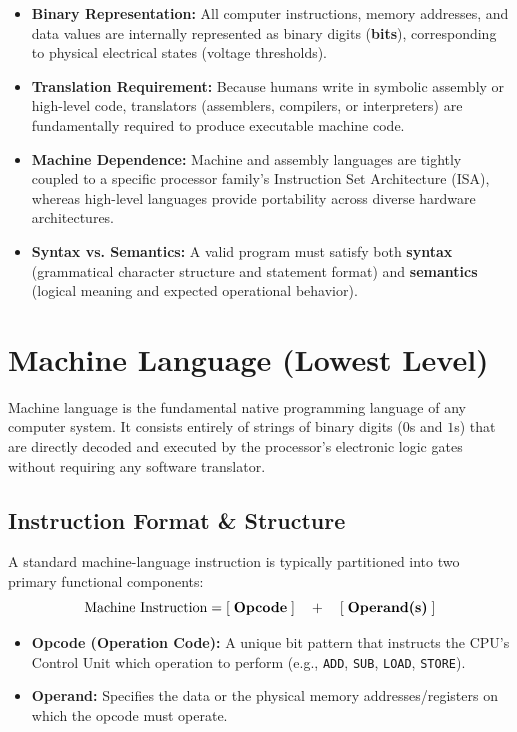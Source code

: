 \begin{definition}
\begin{itemize}[leftmargin=1.2em, itemsep=3pt]
    \item \textbf{Binary Representation:} All computer instructions, memory addresses, and data values are internally represented as binary digits (\textbf{bits}), corresponding to physical electrical states (voltage thresholds).
    \item \textbf{Translation Requirement:} Because humans write in symbolic assembly or high-level code, translators (assemblers, compilers, or interpreters) are fundamentally required to produce executable machine code.
    \item \textbf{Machine Dependence:} Machine and assembly languages are tightly coupled to a specific processor family's Instruction Set Architecture (ISA), whereas high-level languages provide portability across diverse hardware architectures.
    \item \textbf{Syntax vs. Semantics:} A valid program must satisfy both \textbf{syntax} (grammatical character structure and statement format) and \textbf{semantics} (logical meaning and expected operational behavior).
\end{itemize}
\end{definition}

\section{Machine Language (Lowest Level)}

Machine language is the fundamental native programming language of any computer system. It consists entirely of strings of binary digits ($0$s and $1$s) that are directly decoded and executed by the processor's electronic logic gates without requiring any software translator.

\subsection{Instruction Format \& Structure}
A standard machine-language instruction is typically partitioned into two primary functional components:
\begin{equation}
\text{Machine Instruction} = [\;\text{\textbf{Opcode}}\;] \quad+\quad [\;\text{\textbf{Operand(s)}}\;]
\end{equation}
\begin{itemize}[leftmargin=1.2em]
    \item \textbf{Opcode (Operation Code):} A unique bit pattern that instructs the CPU's Control Unit which operation to perform (e.g., \texttt{ADD}, \texttt{SUB}, \texttt{LOAD}, \texttt{STORE}).
    \item \textbf{Operand:} Specifies the data or the physical memory addresses/registers on which the opcode must operate.
\end{itemize}

